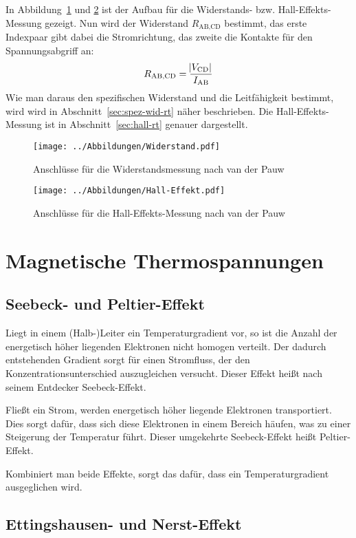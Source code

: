 In Abbildung~\ref{fig:vdPauw-wid} und \ref{fig:vdPauw-hall} ist der Aufbau für
die Widerstands- bzw. Hall-Effekts-Messung gezeigt. Nun wird der Widerstand
$R_\text{AB,CD}$ bestimmt, das erste Indexpaar gibt dabei die Stromrichtung,
das zweite die Kontakte für den Spannungsabgriff an:
\[
    R_\text{AB,CD} = \frac{\abs{V_\text{CD}}}{I_\text{AB}}
\]
Wie man daraus den spezifischen Widerstand und die Leitfähigkeit bestimmt, wird
wird in Abschnitt~\ref{sec:spez-wid-rt} näher beschrieben. Die
Hall-Effekts-Messung ist in Abschnitt~\ref{sec:hall-rt} genauer dargestellt.

\begin{figure}
    \centering
    \texttt{[image: ../Abbildungen/Widerstand.pdf]}
    \caption{%
        Anschlüsse für die Widerstandsmessung nach van der Pauw
    }
    \label{fig:vdPauw-wid}
\end{figure}

\begin{figure}
    \centering
    \texttt{[image: ../Abbildungen/Hall-Effekt.pdf]}
    \caption{%
        Anschlüsse für die Hall-Effekts-Messung nach van der Pauw
    }
    \label{fig:vdPauw-hall}
\end{figure}

\section{Magnetische Thermospannungen}

\subsection{Seebeck- und Peltier-Effekt}

Liegt in einem (Halb-)Leiter ein Temperaturgradient vor, so ist die Anzahl der
energetisch höher liegenden Elektronen nicht homogen verteilt. Der dadurch
entstehenden Gradient sorgt für einen Stromfluss, der den
Konzentrationsunterschied auszugleichen versucht. Dieser Effekt heißt nach
seinem Entdecker Seebeck-Effekt.

Fließt ein Strom, werden energetisch höher liegende Elektronen transportiert.
Dies sorgt dafür, dass sich diese Elektronen in einem Bereich häufen, was zu
einer Steigerung der Temperatur führt. Dieser umgekehrte Seebeck-Effekt heißt
Peltier-Effekt.

Kombiniert man beide Effekte, sorgt das dafür, dass ein Temperaturgradient
ausgeglichen wird.

\subsection{Ettingshausen- und Nerst-Effekt}

